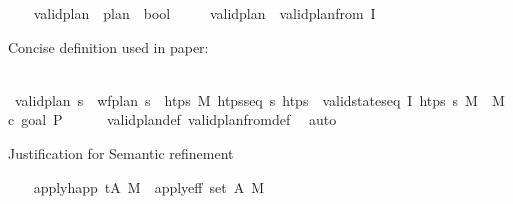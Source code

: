 \begin{isabellebody}
\isanewline
\ \ \isamarkupfalse%
\ valid{\isacharunderscore}{\kern0pt}plan\ {\isacharcolon}{\kern0pt}{\isacharcolon}{\kern0pt}\ {\isachardoublequoteopen}plan\ {\isasymRightarrow}\ bool{\isachardoublequoteclose}\isanewline
\ \ \ \ \ {\isachardoublequoteopen}valid{\isacharunderscore}{\kern0pt}plan\ {\isasymequiv}\ valid{\isacharunderscore}{\kern0pt}plan{\isacharunderscore}{\kern0pt}from\ I{\isachardoublequoteclose}%
\begin{isamarkuptext}%
Concise definition used in paper:%
\end{isamarkuptext}\isamarkuptrue%
\ \ \isamarkupfalse%
\ {\isachardoublequoteopen}valid{\isacharunderscore}{\kern0pt}plan\ {\isasympi}s\ {\isasymequiv}\ wf{\isacharunderscore}{\kern0pt}plan\ {\isasympi}s\ {\isasymand}\ {\isacharparenleft}{\kern0pt}{\isasymexists}htps\ M{\isacharprime}{\kern0pt}{\isachardot}{\kern0pt}\ htps{\isacharunderscore}{\kern0pt}seq\ {\isasympi}s\ htps\ {\isasymand}\ valid{\isacharunderscore}{\kern0pt}state{\isacharunderscore}{\kern0pt}seq\ I\ htps\ {\isasympi}s\ M{\isacharprime}{\kern0pt}\ {\isasymand}\ M{\isacharprime}{\kern0pt}\ \isactrlsup c{\isasymTTurnstile}\isactrlsub {\isacharequal}{\kern0pt}\ {\isacharparenleft}{\kern0pt}goal\ P{\isacharparenright}{\kern0pt}{\isacharparenright}{\kern0pt}{\isachardoublequoteclose}\isanewline
%
\isadelimproof
\ \ \ \ %
\endisadelimproof
%
\isatagproof
{}\isamarkupfalse%
\ valid{\isacharunderscore}{\kern0pt}plan{\isacharunderscore}{\kern0pt}def\ valid{\isacharunderscore}{\kern0pt}plan{\isacharunderscore}{\kern0pt}from{\isacharunderscore}{\kern0pt}def\ \isamarkupfalse%
\ auto%
\endisatagproof
{\isafoldproof}%
%
\isadelimproof
%
\endisadelimproof
%
\isadelimdocument
%
\endisadelimdocument
%
\isatagdocument
%
\isamarkuptrue%
%
\endisatagdocument
{\isafolddocument}%
%
\isadelimdocument
%
\endisadelimdocument
%
\begin{isamarkuptext}%
Justification for Semantic refinement%
\end{isamarkuptext}\isamarkuptrue%
\ \ \isamarkupfalse%
\ {\isachardoublequoteopen}apply{\isacharunderscore}{\kern0pt}happ\ {\isacharparenleft}{\kern0pt}t{\isacharcomma}{\kern0pt}A{\isacharparenright}{\kern0pt}\ M\ {\isacharequal}{\kern0pt}\ apply{\isacharunderscore}{\kern0pt}eff\ {\isacharparenleft}{\kern0pt}set\ A{\isacharparenright}{\kern0pt}\ M{\isachardoublequoteclose}\isanewline

\end{isabellebody}
